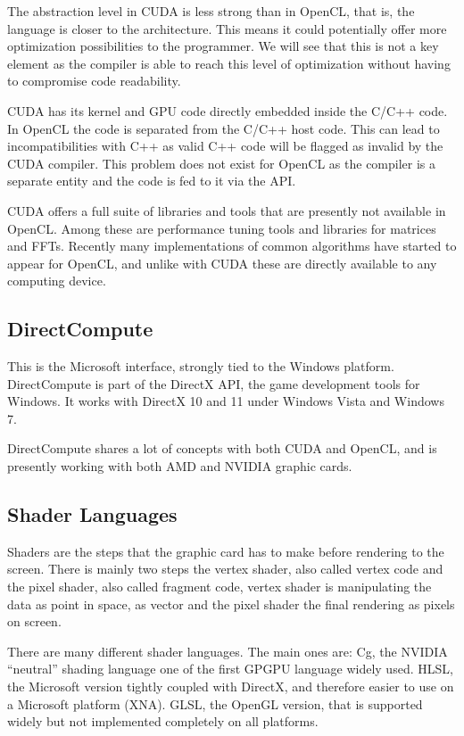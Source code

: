 The abstraction level in \gls{CUDA} is less strong than in \gls{OpenCL}, that is, the language is closer to the architecture. This means it could potentially offer more optimization possibilities to the programmer. We will see that this is not a key element as the compiler is able to reach this level of optimization without having to compromise code readability.

\Gls{CUDA} has its kernel and \gls{GPU} code directly embedded inside the C/C++ code. In \gls{OpenCL} the code is separated from the C/C++ host code. This can lead to incompatibilities with C++ as valid C++ code will be flagged as invalid by the \gls{CUDA} compiler. This problem does not exist for \gls{OpenCL} as the compiler is a separate entity and the code is fed to it via the \gls{API}. 

\Gls{CUDA} offers a full suite of libraries and tools that are presently not available in \gls{OpenCL}. Among these are performance tuning tools and libraries for matrices and \glspl{FFT}. Recently many implementations of common algorithms have started to appear for \gls{OpenCL}, and unlike with \gls{CUDA} these are directly available to any computing device.

\subsection{DirectCompute}

This is the Microsoft interface, strongly tied to the Windows platform. DirectCompute is part of the DirectX API, the game development tools for Windows. It works with DirectX 10 and 11 under Windows Vista and Windows 7. 

DirectCompute shares a lot of concepts with both \gls{CUDA} and \gls{OpenCL}, and is presently working with both AMD and NVIDIA graphic cards.

\subsection{Shader Languages}

Shaders are the steps that the graphic card has to make before rendering to the screen. There is mainly two steps the vertex shader, also called vertex code and the pixel shader, also called fragment code, vertex shader is manipulating the data as point in space, as vector and the pixel shader the final rendering as pixels on screen.

There are many different shader languages. The main ones are: Cg, the NVIDIA “neutral” shading language one of the first \gls{GPGPU} language widely used. \Gls{HLSL}, the Microsoft version tightly coupled with DirectX, and therefore easier to use on a Microsoft platform (XNA). \Gls{GLSL}, the \gls{OpenGL} version, that is supported widely but not implemented completely on all platforms.

